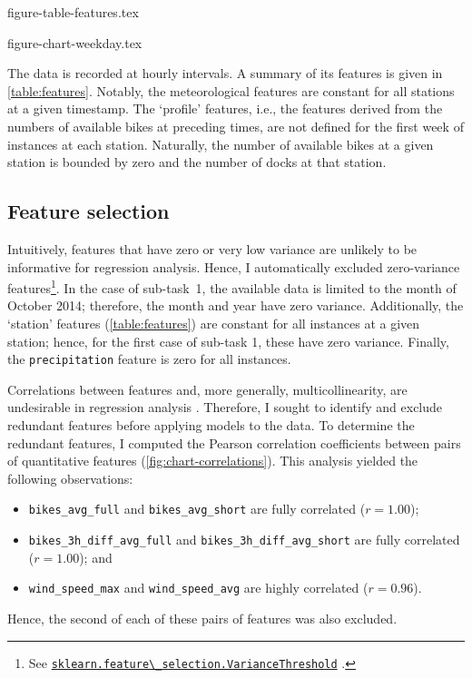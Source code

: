 \documentclass[11pt]{extarticle}
\newcommand{\sklearn}[1]{
  \href{https://scikit-learn.org/stable/modules/generated/sklearn.#1.html}{\lstinline|sklearn.#1|}
}
\newcommand{\windspeedmax}{wind\_speed\_max}
\newcommand{\windspeedavg}{wind\_speed\_avg}
\newcommand{\bikesavgfull}{bikes\_avg\_full}
\newcommand{\bikesavgshort}{bikes\_avg\_short}
\newcommand{\bikeshdiffavgfull}{bikes\_3h\_diff\_avg\_full}
\newcommand{\bikeshdiffavgshort}{bikes\_3h\_diff\_avg\_short}
\begin{document}
{figure-table-features.tex}

{figure-chart-weekday.tex}

The data is recorded at hourly intervals.
A summary of its features is given in \cref{table:features}.
Notably, the meteorological features are constant for all stations at a given timestamp.
The `profile' features, i.e., the features derived from the numbers of available bikes
at preceding times, are not defined for the first week of instances at each station.
Naturally, the number of available bikes at a given station is bounded by zero and the
number of docks at that station.

\subsection{Feature selection}
\label{sec:feature-selection}

Intuitively, features that have zero or very low variance are unlikely to be informative
for regression analysis.
Hence, I automatically excluded zero-variance
features\footnote{See \sklearn{feature\_selection.VarianceThreshold}.}.
In the case of sub-task~1, the available data is limited to the month of October 2014;
therefore, the month and year have zero variance.
Additionally, the `station' features (\cref{table:features}) are constant for all
instances at a given station; hence, for the first case of sub-task 1, these have zero
variance.
Finally, the \texttt{precipitation} feature is zero for all instances.

Correlations between features and, more generally, multicollinearity, are undesirable
in regression analysis \parencite[e.g.,][]{Alin2010}.
Therefore, I sought to identify and exclude redundant features before applying models
to the data.
To determine the redundant features, I computed the Pearson correlation coefficients
between pairs of quantitative features (\cref{fig:chart-correlations}).
This analysis yielded the following observations:
\begin{itemize}
  \item \texttt{\bikesavgfull} and \texttt{\bikesavgshort} are fully correlated ($r = 1.00$);
  \item \texttt{\bikeshdiffavgfull} and \texttt{\bikeshdiffavgshort} are fully correlated ($r  = 1.00$); and
  \item \texttt{\windspeedmax} and \texttt{\windspeedavg} are highly correlated ($r = 0.96$).
\end{itemize}
Hence, the second of each of these pairs of features was also excluded.
\end{document}
